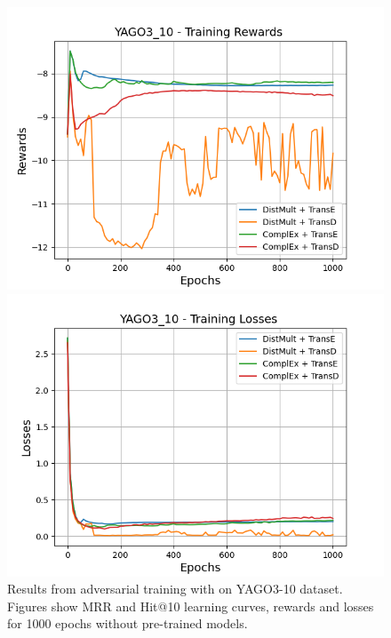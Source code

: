 \begin{figure}[H]
    \begin{minipage}{.45\textwidth}
      \centering
      \includegraphics[width=0.9\linewidth]{figures/results/gan_train/not_pretrained/uncertainty/max/entropy/yago3_10/1k_epochs/uncertainty_yago3_10_rew.png}
    \end{minipage}%
     \begin{minipage}{.45\textwidth}
      \centering
      \includegraphics[width=0.9\linewidth]{figures/results/gan_train/not_pretrained/uncertainty/max/entropy/yago3_10/1k_epochs/uncertainty_yago3_10_losses.png}
    \end{minipage}%
    \caption{Results from adversarial training with \usmax on \textsc{YAGO3-10} dataset.
    Figures show MRR and Hit@10 learning curves, rewards and losses for 1000 epochs without pre-trained models.}
    \label{fig:gan_train_not_pretrained_usmax_yago3_10}
\end{figure}